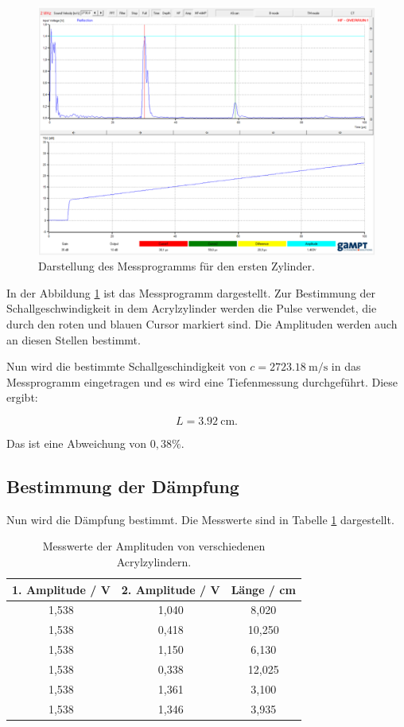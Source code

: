 \begin{figure}[H]
  \centering
  \includegraphics{content/Programm.png}
  \caption{Darstellung des Messprogramms für den ersten Zylinder.}
  \label{abb:1}
\end{figure}

In der Abbildung \ref{abb:1} ist das Messprogramm dargestellt. Zur Bestimmung der
Schallgeschwindigkeit in dem Acrylzylinder werden die Pulse verwendet, die durch
den roten und blauen Cursor markiert sind. Die Amplituden werden auch an diesen Stellen
bestimmt.

Nun wird die bestimmte Schallgeschindigkeit von $c = \SI{2723.18}{\meter\per\second}$
in das Messprogramm eingetragen und es wird eine Tiefenmessung durchgeführt.
Diese ergibt:

\begin{equation*}
  L = \SI{3.92}{\centi\meter}.
\end{equation*}

Das ist eine Abweichung von $0,38 \%$.

\subsection{Bestimmung der Dämpfung}

Nun wird die Dämpfung bestimmt. Die Messwerte sind in Tabelle \ref{tab:3} dargestellt.

\begin{table}[H]
  \centering
  \caption{Messwerte der Amplituden von verschiedenen Acrylzylindern.}
  \label{tab:3}
  \begin{tabular}{c c c}
    \toprule
    1. Amplitude / V & 2. Amplitude / V & Länge / cm \\
    \midrule
    1,538 & 1,040 &  8,020 \\
    1,538 & 0,418 & 10,250 \\
    1,538 & 1,150 &  6,130 \\
    1,538 & 0,338 & 12,025 \\
    1,538 & 1,361 &  3,100 \\
    1,538 & 1,346 &  3,935 \\
    \bottomrule
  \end{tabular}
\end{table}

